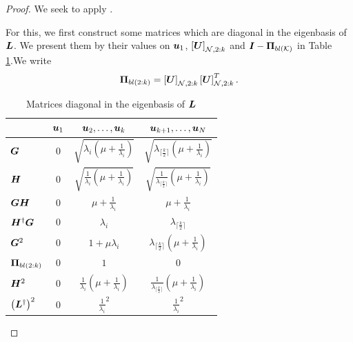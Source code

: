 \begin{proof}
    We seek to apply \cite[Theorem 5]{khatri1982some}.
    
    For this, we first construct some matrices which are diagonal in the eigenbasis of $\bm{L}$. We present them by their values on $\bm{u}_{1}$, $\msubgen[\set{N},2:k]{\matr{U}}$ and $\matr{I} - \projbl$ in Table \ref{tbl:bandlimited_kantorovich_matrices}.We write $$\projgen{bl(2:k)} = \msubgen[\set{N},2:k]{\matr{U}} \msubgen[\set{N},2:k]{\matr{U}}^{T}.$$

\begin{table}[h!]
\caption{Matrices diagonal in the eigenbasis of $\bm{L}$}
    \begin{center}
        \begin{tabular}{|l|c|c|c|}
     \hline
       & $\bm{u}_{1}$ & $\bm{u}_{2},\ldots,\bm{u}_{k}$ & $\bm{u}_{k+1},\ldots,\bm{u}_{N}$ \\ 
     \hline
     $\bm{G}$ & 0 & $\sqrt{\lambda_{i}(\mu + \frac{1}{\lambda_{i}})}$ & $\sqrt{\lambda_{\lceil \frac{k}{2} \rceil}(\mu + \frac{1}{\lambda_{i}})}$ \\
     \hline
     $\bm{H}$ & 0 & $\sqrt{\frac{1}{\lambda_{i}}(\mu + \frac{1}{\lambda_{i}})}$ & $\sqrt{\frac{1}{\lambda_{\lceil \frac{k}{2} \rceil}}(\mu + \frac{1}{\lambda_{i}})}$ \\
     \hline
     $\bm{G}\bm{H}$ & 0 & $\mu + \frac{1}{\lambda_{i}}$ & $\mu + \frac{1}{\lambda_{i}}$ \\
     \hline
     $\bm{H}^{\dagger}\bm{G}$ & 0 & ${\lambda_{i}}$ &  $\lambda_{\lceil \frac{k}{2} \rceil}$\\
     \hline
     $\bm{G}^{2}$ & 0 & $1 + \mu\lambda_{i}$ & $\lambda_{\lceil \frac{k}{2} \rceil}(\mu + \frac{1}{\lambda_{i}})$ \\
     \hline
     $\projgen{bl(2:k)}$ & 0 & $1$ & $0$ \\
     \hline
     $\bm{H}^{2}$ & 0 & $\frac{1}{\lambda_{i}}(\mu + \frac{1}{\lambda_{i}})$ & $\frac{1}{\lambda_{\lceil \frac{k}{2} \rceil}}(\mu + \frac{1}{\lambda_{i}})$ \\
     \hline
     $\left(\bm{L}^{\dagger}\right)^{2}$ & 0 & $\frac{1}{\lambda_{i}}^{2}$ & $\frac{1}{\lambda_{i}}^{2}$  \\
     \hline
        \end{tabular}
    \end{center}
\label{tbl:bandlimited_kantorovich_matrices}
\end{table}


\end{proof}
